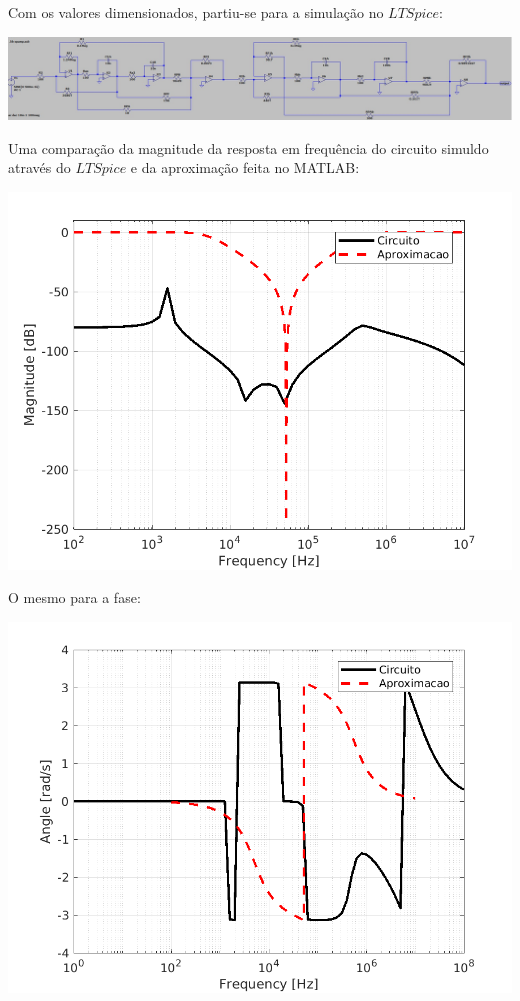 \documentclass{article}
\begin{document}
Com os valores dimensionados, partiu-se para a simulação no $LTSpice$:

\begin{center}
\centering
  \includegraphics[scale=0.35]{img/CircuitoMontado.jpg}
\end{center}

Uma comparação da magnitude da resposta em frequência do circuito simuldo através do $LTSpice$ e da aproximação feita no MATLAB: 

\begin{center}
\centering
  \includegraphics[scale=0.8]{img/result.png}
\end{center}



O mesmo para a fase:

\begin{center}
\centering
  \includegraphics[scale=0.8]{img/phase.png}
\end{center}
\end{document}

